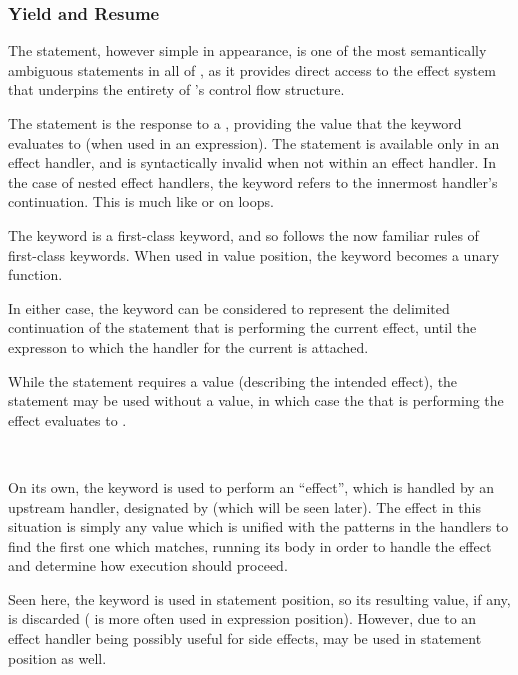 \subsubsection{Yield and Resume}

The  statement, however simple in appearance, is one of the most
semantically ambiguous statements in all of \Trilogy{}, as it provides direct
access to the effect system that underpins the entirety of \Trilogy{}'s control
flow structure.

The  statement is the response to a , providing the value
that the  keyword evaluates to (when used in an expression). The
 statement is available only in an effect handler, and is syntactically
invalid when not within an effect handler. In the case of nested effect handlers,
the  keyword refers to the innermost handler's continuation. This is
much like  or  on loops.

The  keyword is a first-class keyword, and so follows the now familiar
rules of first-class keywords. When used in value position, the  keyword
becomes a unary function.

In either case, the  keyword can be considered to represent the delimited
continuation of the  statement that is performing the current effect, until the
expresson to which the handler for the current  is attached.

While the  statement requires a value (describing the intended effect), the
 statement may be used without a value, in which case the  that
is performing the effect evaluates to .

\begin{bnf*}
     \\
\end{bnf*}

On its own, the  keyword is used to perform an ``effect'', which is
handled by an upstream handler, designated by  (which will be seen later).
The effect in this situation is simply any value which is unified with the patterns
in the handlers to find the first one which matches, running its body in order to
handle the effect and determine how execution should proceed.

Seen here, the  keyword is used in statement position, so its resulting
value, if any, is discarded ( is more often used in expression position).
However, due to an effect handler being possibly useful for side effects, 
may be used in statement position as well.

\begin{prooftree}
\end{prooftree}
